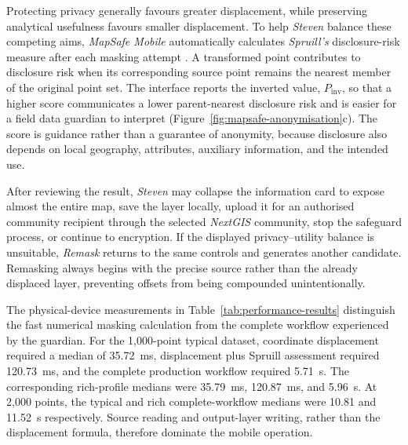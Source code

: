 \documentclass[]{interact}
\begin{document}
Protecting privacy generally favours greater displacement, while preserving analytical usefulness favours smaller displacement. To help \textit{Steven} balance these competing aims, \textit{MapSafe Mobile} automatically calculates \textit{Spruill's} disclosure-risk measure after each masking attempt \citep{armstrong1999geographically,swanlund2020maskmy}. A transformed point contributes to disclosure risk when its corresponding source point remains the nearest member of the original point set.
The interface reports the inverted value, $P_{\mathrm{inv}}$, so that a higher score communicates a lower parent-nearest disclosure risk and is easier for a field data guardian to interpret (Figure~\ref{fig:mapsafe-anonymisation}c). The score is guidance rather than a guarantee of anonymity, because disclosure also depends on local geography, attributes, auxiliary information, and the intended use.

After reviewing the result, \textit{Steven} may collapse the information card to expose almost the entire map, save the layer locally, upload it for an authorised community recipient through the selected \textit{NextGIS} community, stop the safeguard process, or continue to encryption. If the displayed privacy--utility balance is unsuitable, \emph{Remask} returns to the same controls and generates another candidate. Remasking always begins with the precise source rather than the already displaced layer, preventing offsets from being compounded unintentionally.

The physical-device measurements in Table~\ref{tab:performance-results} distinguish the fast numerical masking calculation from the complete workflow experienced by the guardian. For the 1,000-point typical dataset, coordinate displacement required a median of 35.72~ms, displacement plus Spruill assessment required 120.73~ms, and the complete production workflow required 5.71~s. The corresponding rich-profile medians were 35.79~ms, 120.87~ms, and 5.96~s. At 2,000 points, the typical and rich complete-workflow medians were 10.81 and 11.52~s respectively. Source reading and output-layer writing, rather than the displacement formula, therefore dominate the mobile operation.
\end{document}
